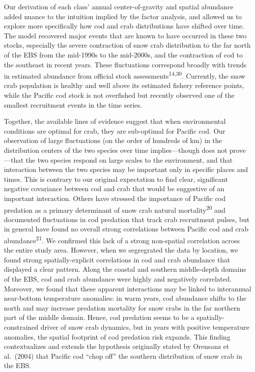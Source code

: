 \documentclass[11pt,]{article}
\begin{document}
Our derivation of each class' annual center-of-gravity and spatial abundance added nuance to the intuition implied by the factor analysis, and allowed us to explore more specifically how cod and crab distributions have shifted over time. The model recovered major events that are known to have occurred in these two stocks, especially the severe contraction of snow crab distribution to the far north of the EBS from the mid-1990s to the mid-2000s, and the contraction of cod to the southeast in recent years. These fluctuations correspond broadly with trends in estimated abundance from official stock assessments\textsuperscript{14,30}. Currently, the snow crab population is healthy and well above its estimated fishery reference points, while the Pacific cod stock is not overfished but recently observed one of the smallest recruitment events in the time series.

Together, the available lines of evidence suggest that when environmental conditions are optimal for crab, they are sub-optimal for Pacific cod. Our observation of large fluctuations (on the order of hundreds of km) in the distribution centers of the two species over time implies---though does not prove---that the two species respond on large scales to the environment, and that interaction between the two species may be important only in specific places and times. This is contrary to our original expectation to find clear, significant negative covariance between cod and crab that would be suggestive of an important interaction. Others have stressed the importance of Pacific cod predation as a primary determinant of snow crab natural mortality\textsuperscript{20} and documented fluctuations in cod predation that track crab recruitment pulses, but in general have found no overall strong correlations between Pacific cod and crab abundance\textsuperscript{21}. We confirmed this lack of a strong non-spatial correlation across the entire study area. However, when we segregrated the data by location, we found strong spatially-explicit correlations in cod and crab abundance that displayed a clear pattern. Along the coastal and southern middle-depth domains of the EBS, cod and crab abundance were highly and negatively correlated. Moreover, we found that these apparent interactions may be linked to interannual near-bottom temperature anomalies: in warm years, cod abundance shifts to the north and may increase predation mortality for snow crabs in the far northern part of the middle domain. Hence, cod predation seems to be a spatially-constrained driver of snow crab dynamics, but in years with positive temperature anomalies, the spatial footprint of cod predation risk expands. This finding contextualizes and extends the hypothesis originally stated by Orensanz et al.~(2004) that Pacific cod ``chop off'' the southern distribution of snow crab in the EBS.
\end{document}
